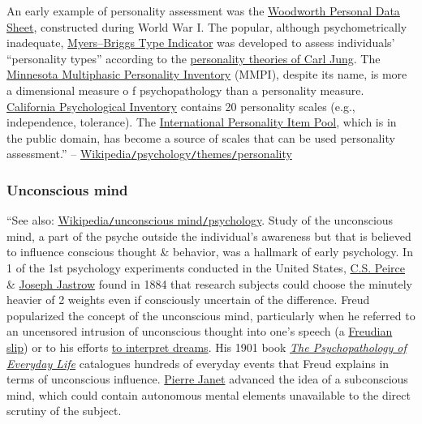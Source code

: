 \documentclass[oneside]{book}
\numberwithin{equation}{section}
\begin{document}
An early example of personality assessment was the \href{https://en.wikipedia.org/wiki/Woodworth_Personal_Data_Sheet}{Woodworth Personal Data Sheet}, constructed during World War I. The popular, although psychometrically inadequate, \href{https://en.wikipedia.org/wiki/Myers%E2%80%93Briggs_Type_Indicator}{Myers--Briggs Type Indicator} was developed to assess individuals' ``personality types'' according to the \href{https://en.wikipedia.org/wiki/Psychological_Types}{personality theories of Carl Jung}. The \href{https://en.wikipedia.org/wiki/Minnesota_Multiphasic_Personality_Inventory}{Minnesota Multiphasic Personality Inventory} (MMPI), despite its name, is more a dimensional measure o f psychopathology than a personality measure. \href{https://en.wikipedia.org/wiki/California_Psychological_Inventory}{California Psychological Inventory} contains 20 personality scales (e.g., independence, tolerance). The \href{https://en.wikipedia.org/wiki/International_Personality_Item_Pool}{International Personality Item Pool}, which is in the public domain, has become a source of scales that can be used personality assessment.'' -- \href{https://en.wikipedia.org/wiki/Psychology#Personality}{Wikipedia\texttt{/}psychology\texttt{/}themes\texttt{/}personality}

\subsubsection{Unconscious mind}
``See also: \href{https://en.wikipedia.org/wiki/Unconscious_mind#Psychology}{Wikipedia\texttt{/}unconscious mind\texttt{/}psychology}. Study of the unconscious mind, a part of the psyche outside the individual's awareness but that is believed to influence conscious thought \& behavior, was a hallmark of early psychology. In 1 of the 1st psychology experiments conducted in the United States, \href{https://en.wikipedia.org/wiki/C.S._Peirce}{C.S. Peirce} \& \href{https://en.wikipedia.org/wiki/Joseph_Jastrow}{Joseph Jastrow} found in 1884 that research subjects could choose the minutely heavier of 2 weights even if consciously uncertain of the difference. Freud popularized the concept of the unconscious mind, particularly when he referred to an uncensored intrusion of unconscious thought into one's speech (a \href{https://en.wikipedia.org/wiki/Freudian_slip}{Freudian slip}) or to his efforts \href{https://en.wikipedia.org/wiki/The_Interpretation_of_Dreams}{to interpret dreams}. His 1901 book \href{https://en.wikipedia.org/wiki/The_Psychopathology_of_Everyday_Life}{\textit{The Psychopathology of Everyday Life}} catalogues hundreds of everyday events that Freud explains in terms of unconscious influence. \href{https://en.wikipedia.org/wiki/Pierre_Janet}{Pierre Janet} advanced the idea of a subconscious mind, which could contain autonomous mental elements unavailable to the direct scrutiny of the subject.
\end{document}
